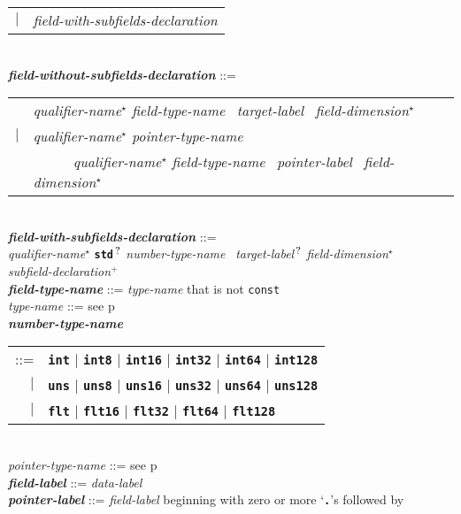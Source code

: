 \documentclass[12pt]{article}
\newcommand{\TT}[1]{{\tt \bfseries #1}}
\newcommand{\STAR}{{\Large $^\star$}}
\newcommand{\PLUS}[1][]{{$^{+#1}$}}
\newcommand{\QMARK}{{$^{\,\mbox{\footnotesize ?}}$}}
\newcommand{\ttkey}[1]{{\tt \bfseries #1}}
\newcommand{\emkey}[1]{{\em \bfseries #1}}
\newcommand{\pagref}[1]{p\pageref{#1}}
\newenvironment{indpar}[1][0.3in]%
	{\begin{list}{}%
		     {\setlength{\itemsep}{0in}%
		      \setlength{\topsep}{0in}%
		      \setlength{\parsep}{1ex}%
		      \setlength{\labelwidth}{#1}%
		      \setlength{\leftmargin}{#1}%
		      \addtolength{\leftmargin}{\labelsep}}%
	 \item}%
	{\end{list}}
\begin{document}
\begin{indpar}
\begin{tabular}[t]{@{}rl}
    $|$ &  {\em field-with-subfields-declaration} \\
    \end{tabular}
\\[2ex]
\emkey{field-without-subfields-declaration} ::= \\
\hspace*{0.5in}\begin{tabular}{rl}
        & {\em qualifier-name}\STAR{} {\em field-type-name}~
          {\em target-label}~ {\em field-dimension}\STAR{} \\
    $|$ & {\em qualifier-name}\STAR{} {\em pointer-type-name} \\
        & ~~~~~ {\em qualifier-name}\STAR{} {\em field-type-name}~
                {\em pointer-label}~ {\em field-dimension}\STAR{}
	\end{tabular}
\\[2ex]
\emkey{field-with-subfields-declaration} ::= \\
\hspace*{0.5in}
    {\em qualifier-name}\STAR{}
    \TT{std}\QMARK{} {\em number-type-name}~ {\em target-label}\QMARK{}
                {\em field-dimension}\STAR{} \\
\hspace*{0.5in}
    {\em subfield-declaration}\PLUS{}
\\[2ex]
\emkey{field-type-name} ::= {\em type-name} that is not {\tt const} \\
{\em type-name} ::= see \pagref{TYPE-NAME} \\
\emkey{number-type-name}
    \begin{tabular}[t]{@{}rl}
    ::= &  \ttkey{int} $|$ \ttkey{int8} $|$ \ttkey{int16} $|$ \ttkey{int32}
                       $|$ \ttkey{int64} $|$ \ttkey{int128} \\
    $|$ &  \ttkey{uns} $|$ \ttkey{uns8} $|$ \ttkey{uns16} $|$ \ttkey{uns32}
                       $|$ \ttkey{uns64} $|$ \ttkey{uns128} \\
    $|$ &  \ttkey{flt} $|$ \ttkey{flt16} $|$ \ttkey{flt32} $|$ \ttkey{flt64}
                         $|$ \ttkey{flt128} \\
    \end{tabular} \\
{\em pointer-type-name} ::= see \pagref{POINTER-TYPE-NAME}
\\[2ex]
\emkey{field-label}\label{FIELD-LABEL} ::=  {\em data-label} \\
\emkey{pointer-label}\label{POINTER-LABEL} ::=
    {\em field-label} beginning with zero or more `\TT{.}'s followed by

\end{indpar}
\end{document}
